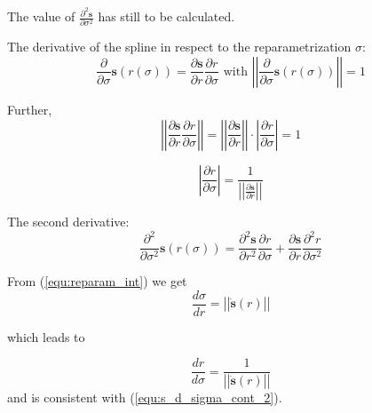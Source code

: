\documentclass[11pt,onecolumn,a4paper,oneside,openright,final]{article}
\begin{document}
The value of $\frac{\partial^2 \mathbf{s}}{\partial \sigma^2}$ has still to be calculated.

The derivative of the spline in respect to the reparametrization $\sigma$:
\begin{equation}
    \frac{\partial}{\partial \sigma} \mathbf{s} \left( r \left( \sigma \right) \right) =
    \frac{\partial \mathbf{s}}{\partial r} \frac{\partial r}{\partial \sigma}
    \textrm{ with }
    \left| \left| \frac{\partial}{\partial \sigma} \mathbf{s} \left( r \left( \sigma \right) \right) \right| \right| = 1
    \label{equ:s_d_sigma}
\end{equation}

Further,
\begin{equation}
    \left| \left| \frac{\partial \mathbf{s}}{\partial r} \frac{\partial r}{\partial \sigma} \right| \right| = 
    \left| \left| \frac{\partial \mathbf{s}}{\partial r} \right| \right| \cdot \left| \frac{\partial r}{\partial \sigma} \right| = 1
    \label{equ:s_d_sigma_cont}
\end{equation}

\begin{equation}
    \left| \frac{\partial r}{\partial \sigma} \right| =
    \frac{1}{\left| \left| \frac{\partial \mathbf{s}}{\partial r} \right| \right|}
    \label{equ:s_d_sigma_cont_2}
\end{equation}


The second derivative:
\begin{equation}
    \frac{\partial^2}{\partial \sigma^2} \mathbf{s} \left( r \left( \sigma \right) \right) =
    \frac{\partial^2 \mathbf{s}}{\partial r^2} \frac{\partial r}{\partial \sigma} +
    \frac{\partial \mathbf{s}}{\partial r} \frac{\partial^2 r}{\partial \sigma^2} 
    \label{equ:s_dd_sigma}
\end{equation}

From (\ref{equ:reparam_int}) we get
\begin{equation}
    \frac{d \sigma}{d r} = \left| \left| \dot{\mathbf{s}} \left( r \right) \right| \right|
    \label{equ:d_sigma_d_r}
\end{equation}

which leads to

\begin{equation}
    \frac{d r}{d \sigma} = \frac{1}{\left| \left| \dot{\mathbf{s}} \left( r \right) \right| \right|}
    \label{equ:d_r_d_sigma}
\end{equation}
and is consistent with (\ref{equ:s_d_sigma_cont_2}).
\end{document}
